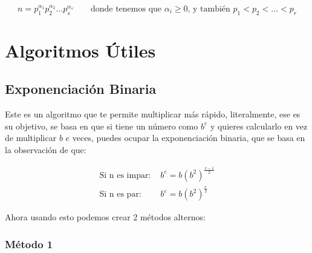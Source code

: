 \documentclass[12pt]{report}                                    %
\DeclareMathOperator \Space {\quad}                             %
\begin{document}
            \begin{equation}
                n = p_1^{\alpha_1}p_2^{\alpha_2} \dots p_s^{\alpha_s}
                \Space
                \text{ donde tenemos que }
                \alpha_i \geq 0 \text{, y también } p_1 < p_2 < \dots < p_r
            \end{equation}








\chapter{Algoritmos Útiles}
    \clearpage

    \section{Exponenciación Binaria}

        Este es un algoritmo que te permite multiplicar más rápido, literalmente, ese es 
        su objetivo, se basa en que si tiene un número como $b^e$ y quieres calcularlo
        en vez de multiplicar $b$ $e$ veces, puedes ocupar la exponenciación binaria, 
        que se basa en la observación de que:

        \begin{equation}
        \begin{split}
            \text{Si n es impar: }  &   b^e = b (b^2)^{\frac{e-1}{2}}   \\
            \text{Si n es par: }    &   b^e = b (b^2)^{\frac{e}{2}}
        \end{split}
        \end{equation}


        Ahora usando esto podemos crear 2 métodos alternos:

        \clearpage
        \subsection*{Método 1}
\end{document}
